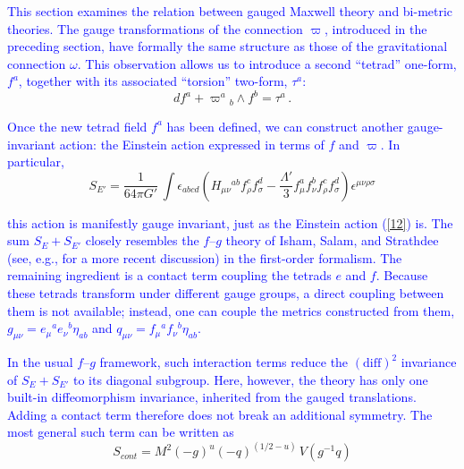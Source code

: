 \documentclass [prd,reprint,eqsecnum,nofootinbib]  {revtex4-1}
\newcommand{\corr}[1]{\textcolor{blue}{#1}}
\begin{document}
\corr{This section examines the relation between gauged Maxwell
theory and bi-metric theories. The gauge transformations of the
connection $\varpi$, introduced in the preceding section, have
formally the same structure as those of the gravitational connection
$\omega$. This observation allows us to introduce a second
``tetrad'' one-form, $f^a$, together with its associated
``torsion'' two-form, $\tau^a$:}
\begin{equation}\label{17}

    df^a + \varpi^a{}_b\wedge f^b=\tau^a\,.

\end{equation}

\corr{Once the new tetrad field $f^a$ has been defined, we can
construct another gauge-invariant action: the Einstein action
expressed in terms of $f$ and $\varpi$. In particular,}
\begin{equation}

S_{E'} =\frac1{64\pi G'}\,

\int\epsilon_{abcd}\left(H_{\mu\nu}{}^{ab}f_{\rho}^{c}f_{\sigma}^{d}

-\frac{\Lambda'}{3}f_{\mu}^{a}f_{\nu}^{b}f_{\rho}^{ c}f_{\sigma}^{

d}\right)\epsilon^{\mu\nu\rho\sigma}\label{18}

\end{equation}

\corr{this action is manifestly gauge invariant, just as the
Einstein action (\ref{12}) is. The sum $S_E+S_{E'}$ closely
resembles the $f$--$g$ theory of Isham, Salam, and Strathdee
\cite{Isham:1971gm} (see, e.g., \cite{Banados:2008fi} for a
more recent discussion) in the first-order formalism. The remaining
ingredient is a contact term coupling the tetrads $e$ and $f$.
Because these tetrads transform under different gauge groups, a
direct coupling between them is not available; instead, one can
couple the metrics constructed from them,
$g_{\mu\nu}=e_\mu{}^a e_\nu{}^b\eta_{ab}$ and
$q_{\mu\nu}=f_\mu{}^a f_\nu{}^b\eta_{ab}$.}

\corr{In the usual $f$--$g$ framework, such interaction terms reduce the
$(\mathrm{diff})^2$ invariance of $S_E+S_{E'}$ to its diagonal
subgroup. Here, however, the theory has only one built-in
diffeomorphism invariance, inherited from the gauged translations.
Adding a contact term therefore does not break an additional
symmetry. The most general such term can be written as}
\begin{equation}\label{19}

    S_{cont} =

   {M^2}(-g)^u(-q)^{(1/2-u)}\, V(g^{-1}q)

\end{equation}
\end{document}

